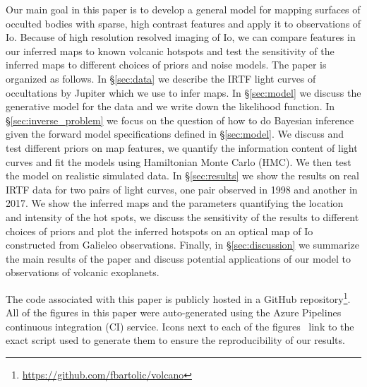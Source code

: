 \documentclass[linenumbers,modern]{aastex62}
\begin{document}
Our main goal in this paper is to develop a general model for mapping surfaces of occulted bodies with sparse, high contrast features and apply it to observations of Io.
Because of high resolution resolved imaging of Io, we can compare features in our inferred maps to known volcanic hotspots and test the sensitivity of the inferred maps to different choices of priors and noise models.
The paper is organized as follows.
In \S\ref{sec:data} we describe the IRTF light curves of occultations by Jupiter which we use to infer maps.
In \S\ref{sec:model} we discuss the generative model for the data and we write down the likelihood function.
In \S\ref{sec:inverse_problem} we focus on the question of how to do Bayesian inference given the forward model specifications defined in \S\ref{sec:model}.
We discuss and test different priors on map features, we quantify the information content of light curves and fit the models using Hamiltonian Monte Carlo (HMC). 
We then test the model on realistic simulated data.
In \S\ref{sec:results} we show the results on real IRTF data for two pairs of light curves, one pair observed in 1998 and another in 2017.
We show the inferred maps and the parameters quantifying the location and intensity of the hot spots, we discuss the sensitivity of the results to different choices of priors and plot the inferred hotspots on an optical map of Io constructed from Galieleo observations.
Finally, in \S\ref{sec:discussion} we summarize the main results of the paper and discuss potential applications of our model to observations of volcanic exoplanets.

\vspace{1em}

The code associated with this paper is publicly hosted in a GitHub repository\footnote{\url{https://github.com/fbartolic/volcano}}. 
All of the figures in this paper were auto-generated
using the Azure Pipelines continuous integration (CI) service.
Icons next to each of the figures \codeicon \,
link to the exact script used to generate them to ensure the reproducibility
of our results. 
\end{document}
